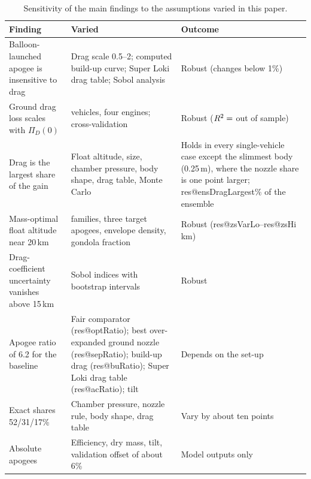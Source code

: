 \documentclass[12pt,a4paper]{article}
\makeatletter
\newcommand{\R}[1]{\csname res@#1\endcsname}
\makeatother
\begin{document}
\begin{table}[!htb]
\centering
\caption{Sensitivity of the main findings to the assumptions varied in this paper.}
\label{tab:robust}
\footnotesize
\begin{tabular}{@{}>{\raggedright\arraybackslash}p{5.2cm}>{\raggedright\arraybackslash}p{5.6cm}>{\raggedright\arraybackslash}p{3.4cm}@{}}
\toprule
Finding & Varied & Outcome \\
\midrule
Balloon-launched apogee is insensitive to drag & Drag scale 0.5--2; computed build-up curve; Super Loki drag table; Sobol analysis & Robust (changes below 1\%) \\
Ground drag loss scales with $\Pi_D(0)$ & 800 vehicles, four engines; cross-validation & Robust ($R^2=\R{cvLd}$ out of sample) \\
Drag is the largest share of the gain & Float altitude, size, chamber pressure, body shape, drag table, Monte Carlo & Holds in every single-vehicle case except the slimmest body (0.25\,m), where the nozzle share is one point larger; \R{ensDragLargest}\% of the ensemble \\
Mass-optimal float altitude near 20\,km & 14 families, three target apogees, envelope density, gondola fraction & Robust (\R{zsVarLo}--\R{zsHi}\,km) \\
Drag-coefficient uncertainty vanishes above 15\,km & Sobol indices with bootstrap intervals & Robust \\
Apogee ratio of 6.2 for the baseline & Fair comparator (\R{optRatio}); best over-expanded ground nozzle (\R{sepRatio}); build-up drag (\R{buRatio}); Super Loki drag table (\R{acRatio}); tilt & Depends on the set-up \\
Exact shares 52/31/17\% & Chamber pressure, nozzle rule, body shape, drag table & Vary by about ten points \\
Absolute apogees & Efficiency, dry mass, tilt, validation offset of about 6\% & Model outputs only \\
\bottomrule
\end{tabular}
\end{table}
\end{document}
